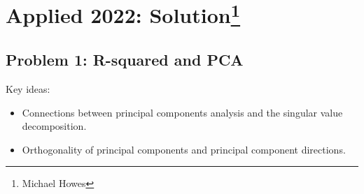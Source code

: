 \section{Applied 2022: Solution\footnote{Michael Howes}}

\subsection*{Problem 1: R-squared and PCA}

Key ideas:
\begin{itemize}
    \item Connections between principal components analysis and the singular value decomposition.
    \item Orthogonality of principal components and principal component directions.
\end{itemize}

